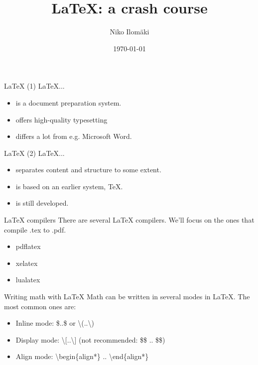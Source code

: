 \documentclass{beamer}
\title[LaTeX]{LaTeX: a crash course}
\author{Niko Ilomäki}
\institute{Matematiikan yö k2014}
\date{\today}
\begin{document}
\begin{frame}
\titlepage
\end{frame}

\begin{frame}{LaTeX (1)}
LaTeX...
\begin{itemize}
\pause \item is a document preparation system.
\pause \item offers high-quality typesetting %
\pause \item differs a lot from e.g. Microsoft Word.
\end{itemize}
\end{frame}

\begin{frame}{LaTeX (2)}
LaTeX...
\begin{itemize}
\pause \item separates content and structure to some extent. %
\pause \item is based on an earlier system, TeX.
\pause \item is still developed.
\end{itemize}
\end{frame}

\begin{frame}{LaTeX compilers}
There are several LaTeX compilers. We'll focus on the ones that compile .tex to .pdf.
\begin{itemize}
\pause \item pdflatex
\pause \item xelatex
\pause \item lualatex
\end{itemize}
\end{frame}

\begin{frame}{Writing math with LaTeX}
Math can be written in several modes in LaTeX. The most common ones are:
\begin{itemize}
\pause \item Inline mode: \$..\$ or \textbackslash(..\textbackslash)
\pause \item Display mode: \textbackslash[..\textbackslash] (not recommended: \$\$ .. \$\$)
\pause \item Align mode: \textbackslash begin\{align*\} .. \textbackslash end\{align*\}
\end{itemize}
\end{frame}
\end{document}
